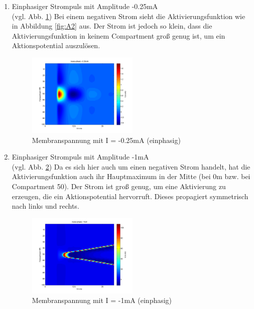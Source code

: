 \documentclass[conference]{IEEEtran}
\begin{document}
\begin{enumerate}
\item Einphasiger Strompuls mit Amplitude -0.25mA\\ (vgl. Abb. \ref{fig:mono_neg_025_1}) Bei einem negativen Strom sieht die Aktivierungsfunktion wie in Abbildung \ref{fig:A2} aus. Der Strom ist jedoch so klein, dass die Aktivierungsfunktion in keinem Compartment groß genug ist, um ein Aktionspotential auszulösen.
\begin{figure}[h!]
	\centering
	\includegraphics[width=0.5\textwidth]{img/mono_neg_025_1.png}
	\caption{Membranspannung mit I = -0.25mA (einphasig)}
	\label{fig:mono_neg_025_1}
\end{figure}

\item Einphasiger Strompuls mit Amplitude -1mA\\ (vgl. Abb. \ref{fig:mono_neg_1_1}) Da es sich hier auch um einen negativen Strom handelt, hat die Aktivierungsfunktion auch ihr Hauptmaximum in der Mitte (bei 0\textmu m bzw. bei Compartment 50). Der Strom ist groß genug, um eine Aktivierung zu erzeugen, die ein Aktionspotential hervorruft. Dieses propagiert symmetrisch nach links und rechts.
\begin{figure}[h!]
	\centering
	\includegraphics[width=0.5\textwidth]{img/mono_neg_1_1.png}
	\caption{Membranspannung mit I = -1mA (einphasig)}
	\label{fig:mono_neg_1_1}
\end{figure}


\end{enumerate}
\end{document}
